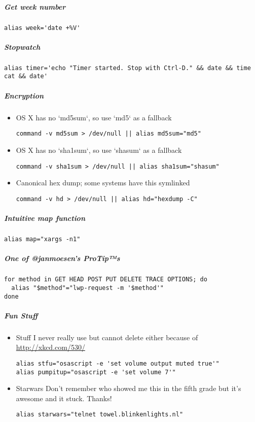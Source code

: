 \documentclass[11pt]{article}
\begin{document}
\subparagraph{Get week number}
\label{sec:org6e3542f}
\begin{verbatim}
alias week='date +%V'
\end{verbatim}

\subparagraph{Stopwatch}
\label{sec:org1a34d00}
\begin{verbatim}
alias timer='echo "Timer started. Stop with Ctrl-D." && date && time cat && date'
\end{verbatim}
\subparagraph{Encryption}
\label{sec:org8f5905b}
\begin{itemize}
\item OS X has no `md5sum`, so use `md5` as a fallback
\label{sec:org447a96a}
\begin{verbatim}
command -v md5sum > /dev/null || alias md5sum="md5"
\end{verbatim}
\item OS X has no `sha1sum`, so use `shasum` as a fallback
\label{sec:org9fc619b}
\begin{verbatim}
command -v sha1sum > /dev/null || alias sha1sum="shasum"
\end{verbatim}
\item Canonical hex dump; some systems have this symlinked
\label{sec:org6148e75}
\begin{verbatim}
command -v hd > /dev/null || alias hd="hexdump -C"
\end{verbatim}
\end{itemize}

\subparagraph{Intuitive map function}
\label{sec:orgb7fdf8b}
\begin{verbatim}
alias map="xargs -n1"
\end{verbatim}

\subparagraph{One of @janmoesen’s ProTip™s}
\label{sec:orgb2a7905}
\begin{verbatim}
for method in GET HEAD POST PUT DELETE TRACE OPTIONS; do
  alias "$method"="lwp-request -m '$method'"
done
\end{verbatim}

\subparagraph{Fun Stuff}
\label{sec:org13a3f1b}
\begin{itemize}
\item Stuff I never really use but cannot delete either because of \url{http://xkcd.com/530/}
\label{sec:orgb6a69ff}
\begin{verbatim}
alias stfu="osascript -e 'set volume output muted true'"
alias pumpitup="osascript -e 'set volume 7'"
\end{verbatim}

\item Starwars
\label{sec:orgfbcbb6e}
Don't remember who showed me this in the fifth grade but it's awesome and it stuck. Thanks!

\begin{verbatim}
alias starwars="telnet towel.blinkenlights.nl"
\end{verbatim}
\end{itemize}
\end{document}
